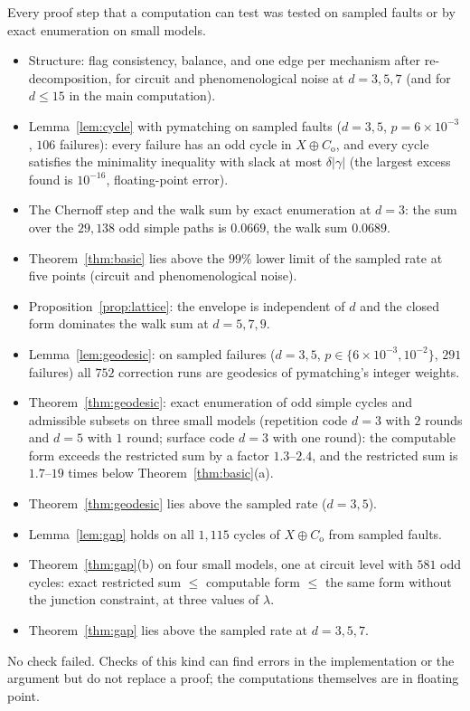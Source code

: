 \documentclass[11pt]{article}
\theoremstyle{plain}
\theoremstyle{definition}
\theoremstyle{remark}
\newcommand{\Co}{C_{\mathrm{o}}}
\renewcommand{\_}{\oldunderscore\allowbreak}
\begin{document}
Every proof step that a computation can test was tested on sampled faults or by exact enumeration on small models.
\begin{itemize}[leftmargin=*,itemsep=1pt]
\item[N1] Structure: flag consistency, balance, and one edge per mechanism after re-decomposition, for circuit and phenomenological noise at $d=3,5,7$ (and for $d\le15$ in the main computation).
\item[N2] Lemma~\ref{lem:cycle} with pymatching on sampled faults ($d=3,5$, $p=6\times10^{-3}$, $106$ failures): every failure has an odd cycle in $X\oplus\Co$, and every cycle satisfies the minimality inequality with slack at most $\delta|\gamma|$ (the largest excess found is $10^{-16}$, floating-point error).
\item[N3] The Chernoff step and the walk sum by exact enumeration at $d=3$: the sum over the $29{,}138$ odd simple paths is $0.0669$, the walk sum $0.0689$.
\item[N4] Theorem~\ref{thm:basic} lies above the $99\%$ lower limit of the sampled rate at five points (circuit and phenomenological noise).
\item[N5] Proposition~\ref{prop:lattice}: the envelope is independent of $d$ and the closed form dominates the walk sum at $d=5,7,9$.
\item[G1] Lemma~\ref{lem:geodesic}: on sampled failures ($d=3,5$, $p\in\{6\times10^{-3},10^{-2}\}$, $291$ failures) all $752$ correction runs are geodesics of pymatching's integer weights.
\item[G2] Theorem~\ref{thm:geodesic}: exact enumeration of odd simple cycles and admissible subsets on three small models (repetition code $d=3$ with $2$ rounds and $d=5$ with $1$ round; surface code $d=3$ with one round): the computable form exceeds the restricted sum by a factor $1.3$--$2.4$, and the restricted sum is $1.7$--$19$ times below Theorem~\ref{thm:basic}(a).
\item[G3] Theorem~\ref{thm:geodesic} lies above the sampled rate ($d=3,5$).
\item[G4] Lemma~\ref{lem:gap} holds on all $1{,}115$ cycles of $X\oplus\Co$ from sampled faults.
\item[G5] Theorem~\ref{thm:gap}(b) on four small models, one at circuit level with $581$ odd cycles: exact restricted sum $\le$ computable form $\le$ the same form without the junction constraint, at three values of $\lambda$.
\item[G6] Theorem~\ref{thm:gap} lies above the sampled rate at $d=3,5,7$.
\end{itemize}
No check failed. Checks of this kind can find errors in the implementation or the argument but do not replace a proof; the computations themselves are in floating point.
\end{document}
